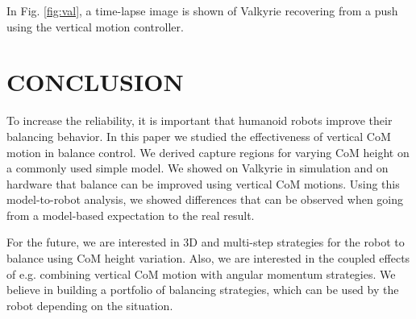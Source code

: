 \documentclass[letterpaper, 10 pt, conference]{ieeeconf}  %
\begin{document}
In Fig. \ref{fig:val}, a time-lapse image is shown of Valkyrie recovering from a push using the vertical motion controller.


\section{CONCLUSION}\label{sec:conclusion}
To increase the reliability, it is important that humanoid robots improve their balancing behavior. In this paper we studied the effectiveness of vertical CoM motion in balance control. We derived capture regions for varying CoM height on a commonly used simple model. We showed on Valkyrie in simulation and on hardware that balance can be improved using vertical CoM motions. Using this model-to-robot analysis, we showed differences that can be observed when going from a model-based expectation to the real result. 

For the future, we are interested in 3D and multi-step strategies for the robot to balance using CoM height variation. Also, we are interested in the coupled effects of e.g. combining vertical CoM motion with angular momentum strategies. We believe in building a portfolio of balancing strategies, which can be used by the robot depending on the situation.


\addtolength{\textheight}{-0cm}   %




\clearpage
\end{document}
